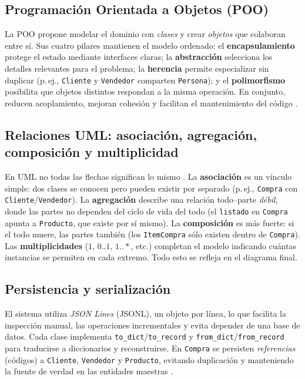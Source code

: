 \documentclass[11pt]{article}
\begin{document}
\subsection{Programación Orientada a Objetos (POO)}
La POO propone modelar el dominio con \emph{clases} y crear \emph{objetos} que colaboran entre sí. Sus cuatro pilares mantienen el modelo ordenado: el \textbf{encapsulamiento} protege el estado mediante interfaces claras; la \textbf{abstracción} selecciona los detalles relevantes para el problema; la \textbf{herencia} permite especializar sin duplicar (p.\,ej., \texttt{Cliente} y \texttt{Vendedor} comparten \texttt{Persona}); y el \textbf{polimorfismo} posibilita que objetos distintos respondan a la misma operación. En conjunto, reducen acoplamiento, mejoran cohesión y facilitan el mantenimiento del código \cite{morero2000,rumbaugh1999}.


\subsection{Relaciones UML: asociación, agregación, composición y multiplicidad}
En UML no todas las flechas significan lo mismo \cite{rumbaugh1999,fowler2004,uml_diagrams}. La \textbf{asociación} es un vínculo simple: dos clases se conocen pero pueden existir por separado (p.\,ej., \texttt{Compra} con \texttt{Cliente}/\texttt{Vendedor}). La \textbf{agregación} describe una relación todo–parte \emph{débil}, donde las partes no dependen del ciclo de vida del todo (el \texttt{listado} en \texttt{Compra} apunta a \texttt{Producto}, que existe por sí mismo). La \textbf{composición} es más fuerte: si el todo muere, las partes también (los \texttt{ItemCompra} sólo existen dentro de \texttt{Compra}). Las \textbf{multiplicidades} (\(1\), \(0..1\), \(1..*\), etc.) completan el modelo indicando cuántas instancias se permiten en cada extremo. Todo esto se refleja en el diagrama final.


\subsection{Persistencia y serialización}
El sistema utiliza \textit{JSON Lines} (JSONL), un objeto por línea, lo que facilita la inspección manual, las operaciones incrementales y evita depender de una base de datos. Cada clase implementa \texttt{to\_dict}/\texttt{to\_record} y \texttt{from\_dict}/\texttt{from\_record} para traducirse a diccionarios y reconstruirse. En \texttt{Compra} se persisten \emph{referencias} (códigos) a \texttt{Cliente}, \texttt{Vendedor} y \texttt{Producto}, evitando duplicación y manteniendo la fuente de verdad en las entidades maestras \cite{json_org,python_docs}.
\end{document}
